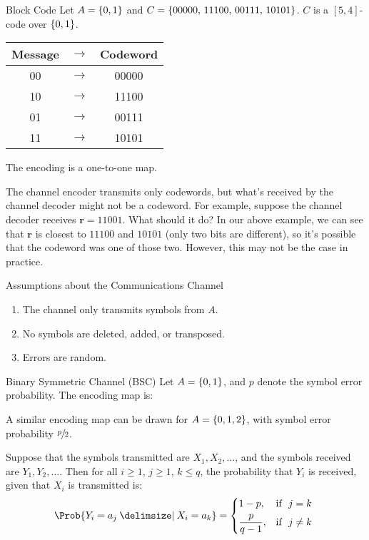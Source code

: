\begin{Example}{Block Code}{}
    Let $ A=\{0,1\} $ and $ C=\{00000,\,11100,\,00111,\,10101\} $.
    $ C $ is a $ [5,4] $-code over $ \{0,1\} $.
    \begin{table}[H]
        \centering
        \begin{tabular}{@{}ccc@{}}
            Message & $ \rightarrow $ & Codeword \\
            \midrule
            00      & $ \rightarrow $ & 00000    \\
            10      & $ \rightarrow $ & 11100    \\
            01      & $ \rightarrow $ & 00111    \\
            11      & $ \rightarrow $ & 10101    \\
        \end{tabular}
    \end{table}
    The encoding is a one-to-one map.
\end{Example}

The channel encoder transmits only codewords, but what's received by the channel
decoder might not be a codeword. For example, suppose the channel decoder
receives $ \symbf{r}=11001 $. What should it do? In our above example, we can see
that $ \symbf{r} $ is closest to $ 11100 $ and $ 10101 $ (only two bits are different),
so it's possible that the codeword was one of those two. However,
this may not be the case in practice.

\begin{Definition}{Assumptions about the Communications Channel}{}
    \begin{enumerate}[label=(\Roman*)]
        \item The channel only transmits symbols from $ A $.
        \item No symbols are deleted, added, or transposed.
        \item Errors are random.
    \end{enumerate}
\end{Definition}

\begin{Example}{Binary Symmetric Channel (BSC)}{}
    Let $ A=\{0,1\} $, and $ p $ denote the symbol error probability.
    The encoding map is:
    \begin{center}
        
    \end{center}
    A similar encoding map can be drawn for $ A=\{0,1,2\} $,
    with symbol error probability $ \sfrac{p}{2} $.

    Suppose that the symbols transmitted are $ X_1,X_2,\ldots $,
    and the symbols received are $ Y_1,Y_2,\ldots $. Then for all
    $ i\geqslant 1 $, $ j\geqslant 1 $, $ k\leqslant q $, the probability
    that $ Y_i $ is received, given that $ X_i $ is transmitted is:
    \[ \Prob{Y_i=a_j\given X_i=a_k}=
        \begin{dcases*}
            1-p,           & \text{if } $ j=k $      \\
            \frac{p}{q-1}, & \text{if } $ j\neq{}k $
        \end{dcases*} \]
\end{Example}

